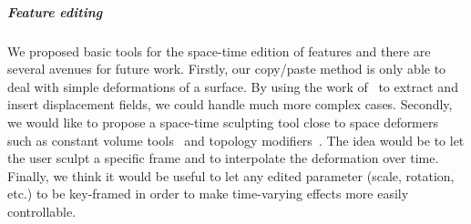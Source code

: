 \subparagraph{Feature editing} 
We proposed basic tools for the space-time edition of features and there are several avenues for future work. 
Firstly, our copy/paste method is only able to deal with simple deformations of a surface. 
By using the work of~\cite{Takahashi2003} to extract and insert displacement fields, we could handle much more complex cases. 
Secondly, we would like to propose a space-time sculpting tool close to space deformers such as constant volume tools~\cite{Angelidis2006b,funk2006vector} and topology modifiers~\cite{stanculescu2011freestyle}. 
The idea would be to let the user sculpt a specific frame and to interpolate the deformation over time. 
Finally, we think it would be useful to let any edited parameter (scale, rotation, etc.) to be key-framed in order to make time-varying effects more easily controllable.

